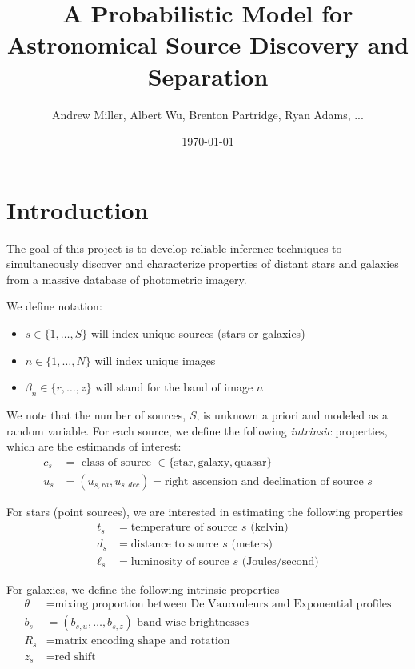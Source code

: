 \documentclass[11pt]{article}
\title{A Probabilistic Model for Astronomical Source Discovery and Separation}
\author{Andrew Miller, Albert Wu, Brenton Partridge, Ryan Adams, ...}
\date{\today}
\begin{document}
\maketitle

\section{Introduction}

The goal of this project is to develop reliable inference techniques to simultaneously discover and characterize properties of distant stars and galaxies from a massive database of photometric imagery.  

We define notation: 
\begin{itemize} \itemsep 0pt
\item $s \in \{1, \dots, S\}$ will index unique sources (stars or galaxies)
\item $n \in \{1, \dots, N\}$ will index unique images
\item $\beta_n \in \{r, \dots, z\}$ will stand for the band of image $n$
\end{itemize}

We note that the number of sources, $S$, is unknown a priori and modeled as a random variable.  For each source, we define the following \emph{intrinsic} properties, which are the estimands of interest: 
\begin{align*}
  c_s &= \text{ class of source } \in \{ \text{star}, \text{galaxy}, \text{quasar} \} \\
  u_s &= (u_{s,ra}, u_{s,dec}) = \text{right ascension and declination of source $s$} 
\end{align*}

For stars (point sources), we are interested in estimating the following properties 
\begin{align*}
  t_s &= \text{temperature of source $s$ (kelvin)} \\
  d_s &= \text{distance to source $s$ (meters)} \\
  \ell_s &= \text{luminosity of source $s$ (Joules/second)} 
\end{align*}

For galaxies, we define the following intrinsic properties 
\begin{align*}
  \theta &= \text{mixing proportion between De Vaucouleurs and Exponential profiles} \\
  b_s    &= (b_{s,u}, \dots, b_{s,z}) \text{ band-wise brightnesses } \\
  R_s    &= \text{matrix encoding shape and rotation} \\
  z_s    &= \text{red shift}
\end{align*}
\end{document}
